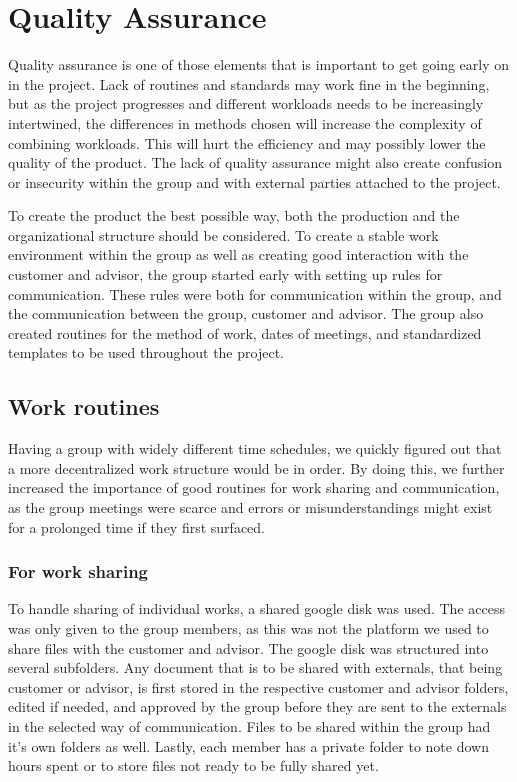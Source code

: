 \documentclass[11pt]{book}
\begin{document}
\section{Quality Assurance}
Quality assurance is one of those elements that is important to get going early on in the project. Lack of routines and standards may work fine in the beginning, but as the project progresses and different workloads needs to be increasingly intertwined, the differences in methods chosen will increase the complexity of combining workloads. This will hurt the efficiency and may possibly lower the quality of the product. The lack of quality assurance might also create confusion or insecurity within the group and with external parties attached to the project.

To create the product the best possible way, both the production and the organizational structure should be considered. To create a stable work environment within the group as well as creating good interaction with the customer and advisor, the group started early with setting up rules for communication. These rules were both for communication within the group, and the communication between the group, customer and advisor. The group also created routines for the method of work, dates of meetings, and standardized templates to be used throughout the project.

\subsection{Work routines}
Having a group with widely different time schedules, we quickly figured out that a more decentralized work structure would be in order. By doing this, we further increased the importance of good routines for work sharing and communication, as the group meetings were scarce and errors or misunderstandings might exist for a prolonged time if they first surfaced.

\subsubsection{For work sharing}
To handle sharing of individual works, a shared google disk was used. The access was only given to the group members, as this was not the platform we used to share files with the customer and advisor. The google disk was structured into several subfolders. Any document that is to be shared with externals, that being customer or advisor, is first stored in the respective customer and advisor folders, edited if needed, and approved by the group before they are sent to the externals in the selected way of communication. Files to be shared within the group had it's own folders as well. Lastly, each member has a private folder to note down hours spent or to store files not ready to be fully shared yet.
\end{document}
